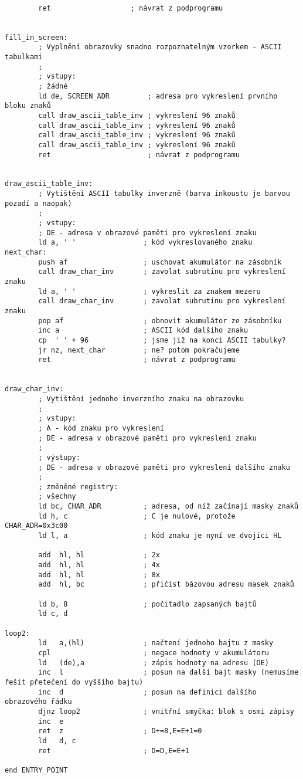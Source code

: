 \documentclass{article}
\begin{document}
\begin{verbatim}
 
        ret                   ; návrat z podprogramu
 
 
fill_in_screen:
        ; Vyplnění obrazovky snadno rozpoznatelným vzorkem - ASCII tabulkami
        ;
        ; vstupy:
        ; žádné
        ld de, SCREEN_ADR         ; adresa pro vykreslení prvního bloku znaků
        call draw_ascii_table_inv ; vykreslení 96 znaků
        call draw_ascii_table_inv ; vykreslení 96 znaků
        call draw_ascii_table_inv ; vykreslení 96 znaků
        call draw_ascii_table_inv ; vykreslení 96 znaků
        ret                       ; návrat z podprogramu
 
 
draw_ascii_table_inv:
        ; Vytištění ASCII tabulky inverzně (barva inkoustu je barvou pozadí a naopak)
        ;       
        ; vstupy:
        ; DE - adresa v obrazové paměti pro vykreslení znaku
        ld a, ' '                ; kód vykreslovaného znaku
next_char:
        push af                  ; uschovat akumulátor na zásobník
        call draw_char_inv       ; zavolat subrutinu pro vykreslení znaku
        ld a, ' '                ; vykreslit za znakem mezeru
        call draw_char_inv       ; zavolat subrutinu pro vykreslení znaku
        pop af                   ; obnovit akumulátor ze zásobníku
        inc a                    ; ASCII kód dalšího znaku
        cp  ' ' + 96             ; jsme již na konci ASCII tabulky?
        jr nz, next_char         ; ne? potom pokračujeme
        ret                      ; návrat z podprogramu
 
 
draw_char_inv:
        ; Vytištění jednoho inverzního znaku na obrazovku
        ;
        ; vstupy:
        ; A - kód znaku pro vykreslení
        ; DE - adresa v obrazové paměti pro vykreslení znaku
        ;
        ; výstupy:
        ; DE - adresa v obrazové paměti pro vykreslení dalšího znaku
        ;
        ; změněné registry:
        ; všechny
        ld bc, CHAR_ADR          ; adresa, od níž začínají masky znaků
        ld h, c                  ; C je nulové, protože CHAR_ADR=0x3c00
        ld l, a                  ; kód znaku je nyní ve dvojici HL
 
        add  hl, hl              ; 2x
        add  hl, hl              ; 4x
        add  hl, hl              ; 8x
        add  hl, bc              ; přičíst bázovou adresu masek znaků
 
        ld b, 8                  ; počitadlo zapsaných bajtů
        ld c, d
 
loop2:
        ld   a,(hl)              ; načtení jednoho bajtu z masky
        cpl                      ; negace hodnoty v akumulátoru
        ld   (de),a              ; zápis hodnoty na adresu (DE)
        inc  l                   ; posun na další bajt masky (nemusíme řešit přetečení do vyššího bajtu)
        inc  d                   ; posun na definici dalšího obrazového řádku
        djnz loop2               ; vnitřní smyčka: blok s osmi zápisy
        inc  e
        ret  z                   ; D+=8,E=E+1=0
        ld   d, c
        ret                      ; D=D,E=E+1
 
end ENTRY_POINT
\end{verbatim}
\end{document}
